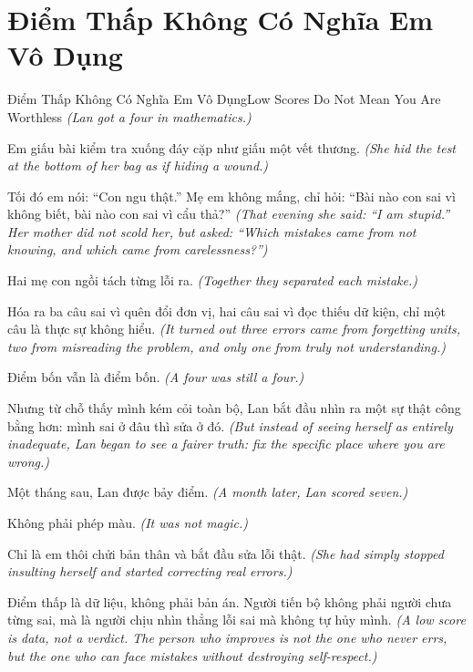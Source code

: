 \section{Điểm Thấp Không Có Nghĩa Em Vô Dụng}
\begin{truyen}{Điểm Thấp Không Có Nghĩa Em Vô Dụng}{Low Scores Do Not Mean You Are Worthless}
\textit{(Lan got a four in mathematics.)}

Em giấu bài kiểm tra xuống đáy cặp như giấu một vết thương.
\textit{(She hid the test at the bottom of her bag as if hiding a wound.)}

Tối đó em nói: ``Con ngu thật.'' Mẹ em không mắng, chỉ hỏi: ``Bài nào con sai vì không biết, bài nào con sai vì cẩu thả?''
\textit{(That evening she said: ``I am stupid.'' Her mother did not scold her, but asked: ``Which mistakes came from not knowing, and which came from carelessness?'')}

Hai mẹ con ngồi tách từng lỗi ra.
\textit{(Together they separated each mistake.)}

Hóa ra ba câu sai vì quên đổi đơn vị, hai câu sai vì đọc thiếu dữ kiện, chỉ một câu là thực sự không hiểu.
\textit{(It turned out three errors came from forgetting units, two from misreading the problem, and only one from truly not understanding.)}

Điểm bốn vẫn là điểm bốn.
\textit{(A four was still a four.)}

Nhưng từ chỗ thấy mình kém cỏi toàn bộ, Lan bắt đầu nhìn ra một sự thật công bằng hơn: mình sai ở đâu thì sửa ở đó.
\textit{(But instead of seeing herself as entirely inadequate, Lan began to see a fairer truth: fix the specific place where you are wrong.)}

Một tháng sau, Lan được bảy điểm.
\textit{(A month later, Lan scored seven.)}

Không phải phép màu.
\textit{(It was not magic.)}

Chỉ là em thôi chửi bản thân và bắt đầu sửa lỗi thật.
\textit{(She had simply stopped insulting herself and started correcting real errors.)}

\end{truyen}

\begin{baihoc}
Điểm thấp là dữ liệu, không phải bản án. Người tiến bộ không phải người chưa từng sai, mà là người chịu nhìn thẳng lỗi sai mà không tự hủy mình.
\textit{(A low score is data, not a verdict. The person who improves is not the one who never errs, but the one who can face mistakes without destroying self-respect.)}
\end{baihoc}

